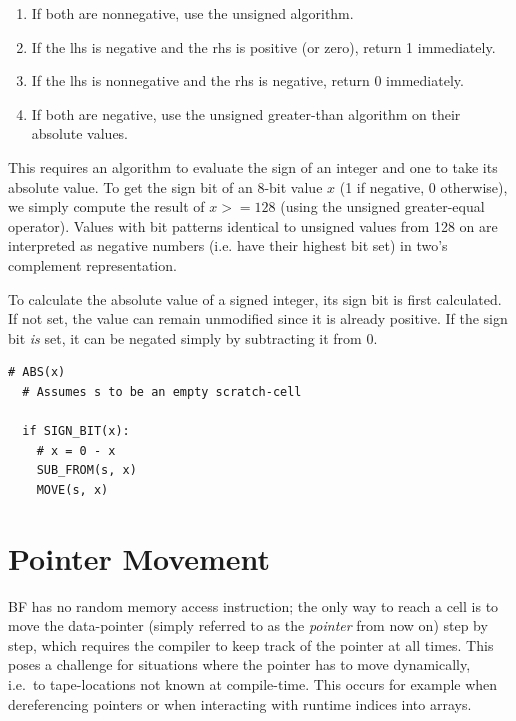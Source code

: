 \begin{enumerate}
\item If both are nonnegative, use the unsigned algorithm.
\item If the lhs is negative and the rhs is positive (or zero), return 1 immediately.
\item If the lhs is nonnegative and the rhs is negative, return 0 immediately.
\item If both are negative, use the unsigned greater-than algorithm on their absolute values.
\end{enumerate}

This requires an algorithm to evaluate the sign of an integer and one to take its absolute value. To get the sign bit of an 8-bit value $x$ (1 if negative, 0 otherwise), we simply compute the result of $x >= 128$ (using the unsigned greater-equal operator). Values with bit patterns identical to unsigned values from 128 on are interpreted as negative numbers (i.e. have their highest bit set) in two's complement representation.

To calculate the absolute value of a signed integer, its sign bit is first calculated. If not set, the value can remain unmodified since it is already positive. If the sign bit \emph{is} set, it can be negated simply by subtracting it from 0.

\vspace{0.5cm}\noindent\begin{minipage}{\linewidth}
\begin{lstlisting}[style=pseudocode]
  # ABS(x)
  # Assumes s to be an empty scratch-cell

  if SIGN_BIT(x):
    # x = 0 - x
    SUB_FROM(s, x)
    MOVE(s, x)
\end{lstlisting}
\end{minipage}

\section{Pointer Movement}
\label{sec:compilation:pointers}
BF has no random memory access instruction; the only way to reach a cell is to move the data-pointer (simply referred to as the \emph{pointer} from now on) step by step, which requires the compiler to keep track of the pointer at all times. This poses a challenge for situations where the pointer has to move dynamically, i.e.~to tape-locations not known at compile-time. This occurs for example when dereferencing pointers or when interacting with runtime indices into arrays.


